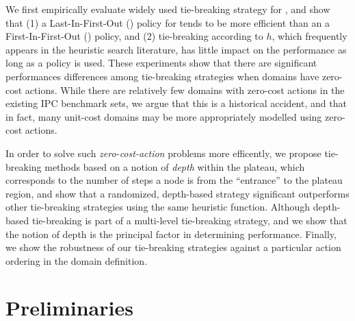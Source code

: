 We first empirically evaluate widely used tie-breaking strategy for \astar, and show that 
% 
(1) a Last-In-First-Out (\lifo) policy for tends to be more efficient than an a First-In-First-Out (\fifo) policy, and 
% 
(2) tie-breaking according to $h$, which
frequently appears in the heuristic search literature, has little 
impact on the performance as long as a \lifo policy is used.
% 
These experiments show that there are significant performances differences among tie-breaking strategies
when domains have zero-cost actions.  While there are relatively few domains with zero-cost actions in the existing IPC benchmark sets, we argue that this is a historical accident, and that in fact, many unit-cost domains may be more appropriately modelled using zero-cost actions.

In order to solve such \emph{zero-cost-action} problems more efficently,
we propose 
tie-breaking methods
based on a notion of \emph{depth} within the plateau, which corresponds to the number of steps 
a node is from the ``entrance'' to the plateau region, and show that a randomized, depth-based strategy
significant outperforms 
other tie-breaking strategies using the same heuristic function.
Although depth-based tie-breaking is part of a multi-level tie-breaking strategy,
and we show that the notion of depth is the principal factor in determining performance.
Finally, we show the robustness of our tie-breaking strategies
against a particular action ordering in the domain definition.





\section{Preliminaries}

